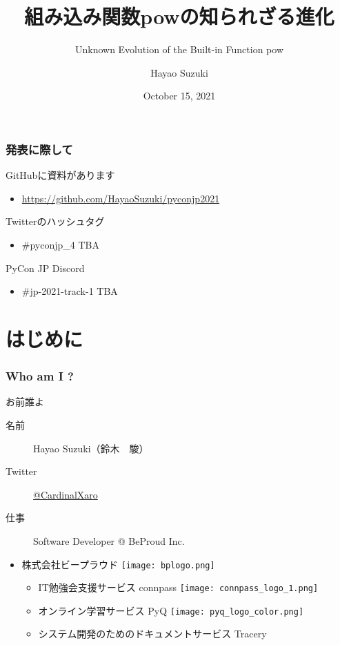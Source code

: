 \documentclass[aspectratio=169,dvipdfmx,14pt,notheorems]{beamer}
\title{組み込み関数powの知られざる進化}
\subtitle{Unknown Evolution of the Built-in Function pow}
\author[Hayao]{Hayao Suzuki}
\institute[PyCon JP 2021]{PyCon JP 2021}
\date{October 15, 2021}
\theoremstyle{definition}
\begin{document}
\begin{frame}[plain]\frametitle{}
\titlepage %
\end{frame}

\begin{frame}\frametitle{発表に際して}

\begin{block}{GitHubに資料があります}
\begin{itemize}
\item \url{https://github.com/HayaoSuzuki/pyconjp2021}
\end{itemize}
\end{block}

\begin{block}{Twitterのハッシュタグ}
\begin{itemize}
\item \#pyconjp\_4 TBA
\end{itemize}
\end{block}

\begin{block}{PyCon JP Discord}
\begin{itemize}
\item \#jp-2021-track-1 TBA
\end{itemize}
\end{block}
\end{frame}

\section{はじめに}

\begin{frame}\frametitle{Who am I ?}

\begin{block}{お前誰よ}
\begin{description}
\item[名前] Hayao Suzuki（鈴木　駿）
\item[Twitter] \href{https://twitter.com/CardinalXaro}{@CardinalXaro}
\item[仕事] Software Developer @ BeProud Inc.
\end{description}
\end{block}

\begin{center}
\begin{itemize}
\item 株式会社ビープラウド \texttt{[image: bplogo.png]}
\begin{itemize}
\item IT勉強会支援サービス connpass \texttt{[image: connpass\_logo\_1.png]}
\item オンライン学習サービス PyQ \texttt{[image: pyq\_logo\_color.png]}
\item システム開発のためのドキュメントサービス Tracery
\end{itemize}
\end{itemize}
\end{center}

\end{frame}
\end{document}
